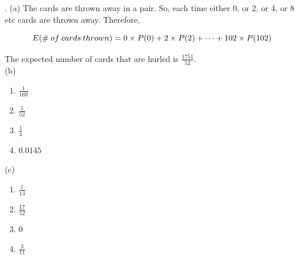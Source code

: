 \documentclass{article}
\begin{document}
. (a) The cards are thrown away in a pair. So, each time either 0, or 2, or 4, or 8 etc cards are thrown away. Therefore, 

\vspace{-10pt}

\begin{equation}
    E(\# \: of \: cards \: thrown) = 0 \times P(0) + 2 \times P(2) + \cdots + 102 \times P(102) \notag
\end{equation}

The expected number of cards that are hurled is $\frac{1751}{52}$. \\

(b)  

\begin{enumerate}[i]
  \item $\frac{1}{169}$
  \item $\frac{1}{52}$
  \item $\frac{1}{4}$
  \item $0.0145$
\end{enumerate} 

(c)

\begin{enumerate}[i]
   \item $\frac{1}{13}$
    \item $\frac{17}{52}$
    \item $0$
    \item $\frac{3}{11}$
\end{enumerate}
\end{document}
